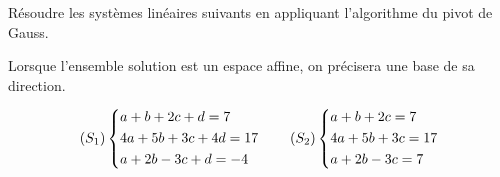 \begin{corr}
\end{corr}

\begin{exo}[Exercice 22]
Résoudre les systèmes linéaires suivants en appliquant l'algorithme du pivot de Gauss.

Lorsque l'ensemble solution est un espace affine, on précisera une base de sa direction.

\[\left(S_1\right)\begin{dcases}
a+b+2c+d=7 \\
4a+5b+3c+4d=17 \\
a+2b-3c+d=-4
\end{dcases}\qquad\left(S_2\right)\begin{dcases}
a+b+2c=7 \\
4a+5b+3c=17 \\
a+2b-3c=7
\end{dcases}\]
\end{exo}

\begin{corr}
\end{corr}